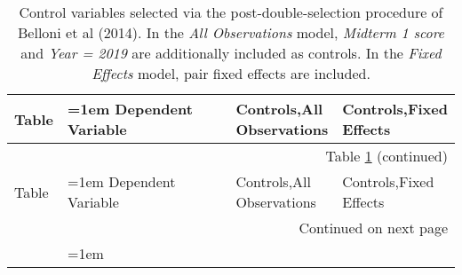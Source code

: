 \begin{spacing}{1.0}\centering 
\begin{longtable}{p{0.1\linewidth} >{\hangindent=1em}p{0.5\linewidth} p{0.2\linewidth} p{0.2\linewidth}}
\caption{Control variables selected via the post-double-selection procedure of Belloni et al (2014). In the \textit{All Observations} model, \textit{Midterm 1 score} and \textit{Year = 2019} are additionally included as controls. In the \textit{Fixed Effects} model, pair fixed effects are included.} \label{controlvars_selected}\\ 
\toprule 
Table & Dependent Variable & Controls,\newline All Observations & Controls,\newline Fixed Effects \\ 
\midrule 
\endfirsthead 
\multicolumn{4}{r}{{Table \ref{controlvars_selected} (continued)}} \\ 
\toprule
   Table &                         Dependent Variable &                  Controls,\newline All Observations &                                            Controls,\newline Fixed Effects \\
\midrule
\endhead
\midrule
\multicolumn{4}{r}{{Continued on next page}} \\
\midrule
\endfoot


\end{longtable}
\end{spacing}
